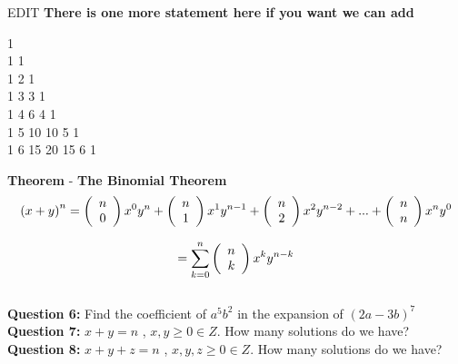 \documentclass[11pt]{article}
\begin{document}
EDIT
\textbf{There is one more statement here if you want we can add}
\\

\begin{center}
1\\1 1\\1 2 1\\1 3 3 1\\1 4 6 4 1\\1 5 10 10 5 1\\1 6 15 20 15 6 1\\
\end{center}

\textbf{Theorem} - \textbf{The Binomial Theorem}
$$\left({x+y}\right)^n = \left( {\begin{array}{*{20}c} n  \\ 0  \\ \end{array}} \right) x^0 y^n +  \left( {\begin{array}{*{20}c} n  \\ 1  \\ \end{array}} \right) x^1 y^{n-1} + \left( {\begin{array}{*{20}c} n  \\ 2 \\ \end{array}} \right) x^2 y^{n-2} + ... + \left( {\begin{array}{*{20}c} n  \\ n \\ \end{array}} \right) x^n y^0$$

$$= \sum\limits_{k = 0}^n {\left( {\begin{array}{*{20}c} n  \\ k  \\ \end{array}} \right) x^k y^{n-k}}$$
\\

\textbf{Question 6: } Find the coefficient of $a^5b^2$ in the expansion of  $\left(2a-3b\right)^7$
\\ %

\textbf{Question 7: }  $x+y = n$ , $x,y \geq 0 \in Z$. How many solutions do we have? 
\\ %

\textbf{Question 8: }  $x+y+z = n$ , $x,y,z \geq 0 \in Z$. How many solutions do we have?
\\ %
\end{document}
